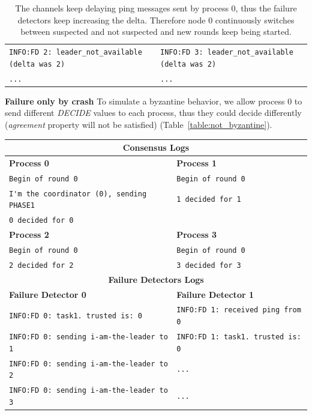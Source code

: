 \documentclass[a4paper]{article}
\begin{document}
\begin{compactitem}
\begin{table}[H]
\begin{tabular}{ll}
		\verb|INFO:FD 2: leader_not_available (delta was 2)| & \verb|INFO:FD 3: leader_not_available (delta was 2)| \\
		\verb|...| & \verb|...| \\
        \bottomrule
        \end{tabular}
        \caption{\small{The channels keep delaying ping messages sent by process $0$, thus the failure detectors keep increasing the delta. Therefore node $0$ continuously switches between suspected and not suspected and new rounds keep being started.}}
        \label{table:partially_async}
	\end{table}
  \item \textbf{Failure only by crash} To simulate a byzantine behavior, we allow process $0$ to send different \emph{DECIDE} values to each process, thus they could decide differently (\emph{agreement} property will not be satisfied) (Table~\ref{table:not_byzantine}).
  	\begin{table}[H]
		\centering\scriptsize
        \begin{tabular}{ll}
		\toprule
        \multicolumn{2}{c}{\textbf{Consensus Logs}} \\
        \midrule
		\textbf{Process 0} & \textbf{Process 1} \\
		\midrule
        \verb|Begin of round 0| & \verb|Begin of round 0| \\
		\verb|I'm the coordinator (0), sending PHASE1| & \verb|1 decided for 1| \\
		\verb|0 decided for 0| & \\
        \midrule
		\textbf{Process 2} & \textbf{Process 3} \\
		\midrule
        \verb|Begin of round 0| & \verb|Begin of round 0| \\
		\verb|2 decided for 2| & \verb|3 decided for 3| \\
        \bottomrule\toprule
		\multicolumn{2}{c}{\textbf{Failure Detectors Logs}} \\
		\midrule
		\textbf{Failure Detector 0} & \textbf{Failure Detector 1} \\
		\midrule
		\verb|INFO:FD 0: task1. trusted is: 0| & \verb|INFO:FD 1: received ping from 0| \\
		\verb|INFO:FD 0: sending i-am-the-leader to 1| & \verb|INFO:FD 1: task1. trusted is: 0| \\
		\verb|INFO:FD 0: sending i-am-the-leader to 2| & \verb|...| \\
		\verb|INFO:FD 0: sending i-am-the-leader to 3| & \verb|...| \\

\end{tabular}
\end{table}
\end{compactitem}
\end{document}
